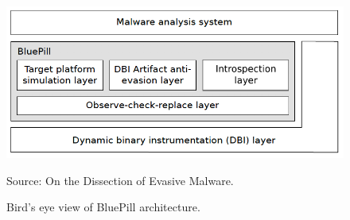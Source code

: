 \documentclass[LaM,binding=0.6cm]{sapthesis}
\newcommand{\source}[1]{\caption*{Source: {#1}} }
\begin{document}
\begin{figure}[h!]
\centering
\includegraphics[scale=.6]{images/techn8}
\caption{Bird's eye view of BluePill architecture.}
\source{On the Dissection of Evasive Malware.}
\end{figure}
\end{document}
